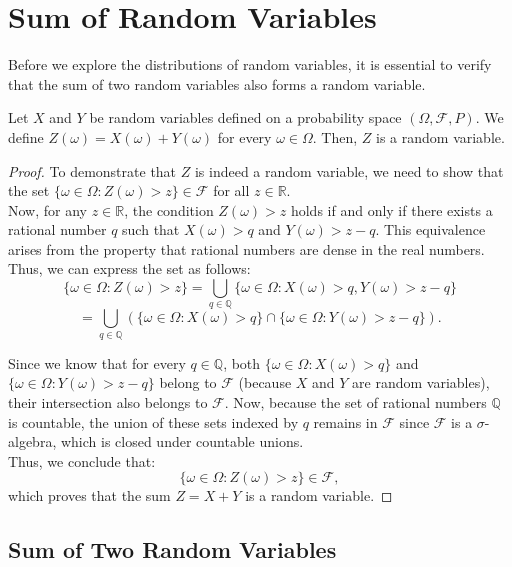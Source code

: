 \section{Sum of Random Variables}

Before we explore the distributions of random variables, it is essential to verify that the sum of two random variables also forms a random variable.

\begin{theorem}
    Let \(X\) and \(Y\) be random variables defined on a probability space \((\Omega, \mathcal{F}, P)\). We define \(Z(\omega) = X(\omega) + Y(\omega)\) for every \(\omega \in \Omega\). Then, \(Z\) is a random variable.
\end{theorem}

\begin{proof}
To demonstrate that \(Z\) is indeed a random variable, we need to show that the set \(\{ \omega \in \Omega : Z(\omega) > z \} \in \mathcal{F}\) for all \(z \in \mathbb{R}\).\\

Now, for any \(z \in \mathbb{R}\), the condition \(Z(\omega) > z\) holds if and only if there exists a rational number \(q\) such that \(X(\omega) > q\) and \(Y(\omega) > z - q\). This equivalence arises from the property that rational numbers are dense in the real numbers. Thus, we can express the set as follows:
\[
\{ \omega \in \Omega : Z(\omega) > z \} = \bigcup_{q \in \mathbb{Q}} \{ \omega \in \Omega : X(\omega) > q, Y(\omega) > z - q \} 
\]
\[
    = \bigcup_{q \in \mathbb{Q}} \left( \{ \omega \in \Omega : X(\omega) > q \} \cap \{ \omega \in \Omega : Y(\omega) > z - q \} \right).
\]

Since we know that for every \(q \in \mathbb{Q}\), both \(\{ \omega \in \Omega : X(\omega) > q \}\) and \(\{ \omega \in \Omega : Y(\omega) > z - q \}\) belong to \(\mathcal{F}\) (because \(X\) and \(Y\) are random variables), their intersection also belongs to \(\mathcal{F}\). Now, because the set of rational numbers \(\mathbb{Q}\) is countable, the union of these sets indexed by \(q\) remains in \(\mathcal{F}\) since \(\mathcal{F}\) is a \(\sigma\)-algebra, which is closed under countable unions.\\

Thus, we conclude that:
\[
\{ \omega \in \Omega : Z(\omega) > z \} \in \mathcal{F},
\]
which proves that the sum \(Z = X + Y\) is a random variable.
\end{proof}

\subsection{Sum of Two Random Variables}

